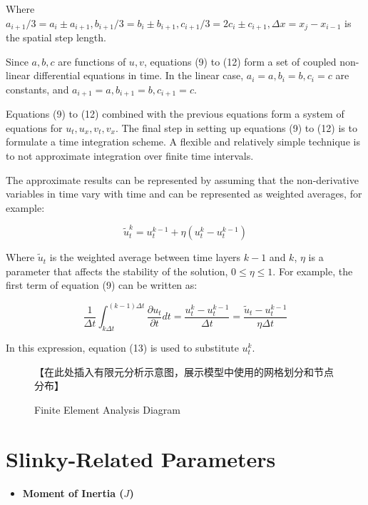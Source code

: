 \documentclass{mcmthesis}  %
\begin{document}
\begin{appendices}
Where $a_{i+1}/3 = a_i \pm a_{i+1}, b_{i+1}/3 = b_i \pm b_{i+1}, c_{i+1}/3 = 2c_i \pm c_{i+1}, \Delta x = x_j - x_{i-1}$ is the spatial step length.

Since $a, b, c$ are functions of $u, v$, equations (9) to (12) form a set of coupled non-linear differential equations in time. In the linear case, $a_i = a, b_i = b, c_i = c$ are constants, and $a_{i+1} = a, b_{i+1} = b, c_{i+1} = c$.

Equations (9) to (12) combined with the previous equations form a system of equations for $u_t, u_x, v_t, v_x$. The final step in setting up equations (9) to (12) is to formulate a time integration scheme. A flexible and relatively simple technique is to not approximate integration over finite time intervals.

The approximate results can be represented by assuming that the non-derivative variables in time vary with time and can be represented as weighted averages, for example:

\begin{equation}
\tilde{u}_t^k = u_t^{k-1} + \eta(u_t^k - u_t^{k-1})
\end{equation}

Where $\tilde{u}_t$ is the weighted average between time layers $k-1$ and $k$, $\eta$ is a parameter that affects the stability of the solution, $0 \leq \eta \leq 1$. For example, the first term of equation (9) can be written as:

\begin{equation}
\frac{1}{\Delta t} \int_{k\Delta t}^{(k-1)\Delta t} \frac{\partial u_t}{\partial t} dt = \frac{u_t^k - u_t^{k-1}}{\Delta t} = \frac{\tilde{u}_t - u_t^{k-1}}{\eta \Delta t}
\end{equation}

In this expression, equation (13) is used to substitute $u_t^k$.

\begin{figure}[h!]
    \centering
    【在此处插入有限元分析示意图，展示模型中使用的网格划分和节点分布】
    \caption{Finite Element Analysis Diagram}
    \label{fig:finite_element_analysis}
\end{figure}

\section{Slinky-Related Parameters}  %

\begin{itemize}
    \item \textbf{Moment of Inertia ($J$)}
    

\end{itemize}
\end{appendices}
\end{document}
